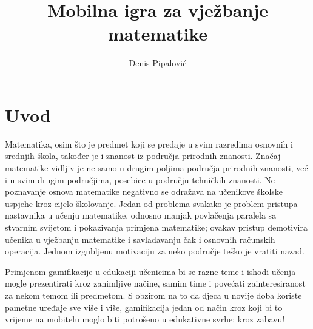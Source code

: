 \documentclass[times, utf8, zavrsni]{fer}
\begin{document}

\title{Mobilna igra za vježbanje matematike}

\author{Denis Pipalović}

\maketitle



\zahvala{}

\tableofcontents

\chapter{Uvod}
	Matematika, osim što je predmet koji se predaje u svim razredima osnovnih i srednjih škola, također je i znanost iz područja prirodnih znanosti.
Značaj matematike vidljiv je ne samo u drugim poljima područja prirodnih znanosti, već i u svim drugim područjima, posebice u području tehničkih znanosti.
Ne poznavanje osnova matematike negativno se odražava na učenikove školske uspjehe kroz cijelo školovanje. Jedan od problema svakako je problem pristupa nastavnika
 u učenju matematike, odnosno manjak povlačenja paralela sa stvarnim svijetom i pokazivanja primjena matematike; ovakav pristup demotivira učenika u vježbanju matematike
i savladavanju čak i osnovnih računskih operacija. Jednom izgubljenu motivaciju za neko područje teško je vratiti nazad.

Primjenom gamifikacije u edukaciji učenicima bi se razne teme i ishodi učenja mogle prezentirati kroz zanimljive načine, samim time i povećati zainteresiranost za nekom temom 
ili predmetom. S obzirom na to da djeca u novije doba koriste pametne uređaje sve više i više, gamifikacija jedan od način kroz koji bi to vrijeme na mobitelu moglo biti potrošeno
 u edukativne svrhe; kroz zabavu!
\end{document}
